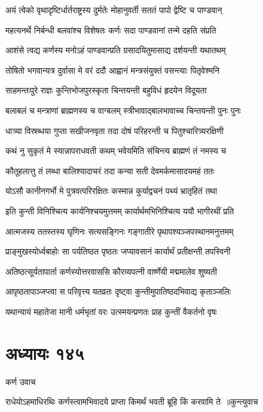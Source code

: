 \twolineshloka
{अयं त्वेको वृथादृष्टिर्धार्तराष्ट्रस्य दुर्मतेः}
{मोहानुवर्ती सततं पापो द्वेष्टि च पाण्डवान्}


\twolineshloka
{महत्यनर्थे निर्बन्धी बलवांश्च विशेषतः}
{कर्णः सदा पाण्डवानां तन्मे दहति संप्रति}


\twolineshloka
{आशंसे त्वद्य कर्णस्य मनोऽहं पाण्डवान्प्रति}
{ग्रसादयितुमासाद्य दर्शयन्ती यथातथम्}


\twolineshloka
{तोषितो भगवान्यत्र दुर्वासा मे वरं ददौ}
{आह्वानं मन्त्रसंयुक्तं वसन्त्याः पितृवेश्मनि}


\twolineshloka
{साहमन्तःपुरे राज्ञः कुन्तिभोजपुरस्कृता}
{चिन्तयन्ती बहुविधं हृदयेन विदूयता}


\twolineshloka
{बलाबलं च मन्त्राणां ब्राह्मणस्य च वाग्बलम्}
{स्त्रीभावाद्बालभावाच्च चिन्तयन्ती पुनः पुनः}


\twolineshloka
{धात्र्या विस्रब्धया गुप्ता सखीजनवृता तदा}
{दोषं परिहरन्ती च पितुश्चारित्र्यरक्षिणी}


\twolineshloka
{कथं नु सुकृतं मे स्यान्नापराधवती कथम्}
{भवेयमिति संचिन्त्य ब्राह्मणं तं नमस्य च}


\twolineshloka
{कौतूहलात्तु तं लब्धा बालिश्यादाचरं तदा}
{कन्या सती देवमर्कमासादयमहं ततः}


\twolineshloka
{योऽसौ कानीनगर्भो मे पुत्रवत्परिरक्षितः}
{कस्मान्न कुर्याद्वचनं पथ्यं भ्रातृहितं तथा}


\twolineshloka
{इति कुन्ती विनिश्चित्य कार्यनिश्चयमुत्तमम्}
{कार्यार्थमभिनिश्चित्य ययौ भागीरथीं प्रति}


\twolineshloka
{आत्मजस्य ततस्तस्य घृणिनः सत्यसङ्गिनः}
{गङ्गातीरे पृथापश्यञ्जपस्थानमनुत्तमम्}


\twolineshloka
{प्राङ्मुखस्योर्ध्वबाहोः सा पर्यतिष्ठत पृष्ठतः}
{जप्यावसानं कार्यार्थं प्रतीक्षन्ती तपस्विनी}


\twolineshloka
{अतिष्ठत्सूर्यतापार्ता कर्णस्योत्तरवाससि}
{कौरव्यपत्नी वार्ष्णेयी मद्ममालेव शुष्यती}


\twolineshloka
{आपृष्ठतापाञ्जप्त्वा स परिवृत्त्य यतव्रतः}
{दृष्ट्वा कुन्तीमुपातिष्ठदभिवाद्य कृताञ्जलिः}


\twolineshloka
{यथान्यायं महातेजा मानी धर्मभृतां वरः}
{उत्स्मयन्प्रणतः प्राह कुन्तीं वैकर्तनो वृषः}


\chapter{अध्यायः १४५}
\twolineshloka
{कर्ण उवाच}
{}


\threelineshloka
{राधेयोऽहमाधिरथिः कर्णस्त्वामभिवादये}
{प्राप्ता किमर्थं भवती ब्रूहि किं करवामि ते ॥कुन्त्युवाच}
{}


